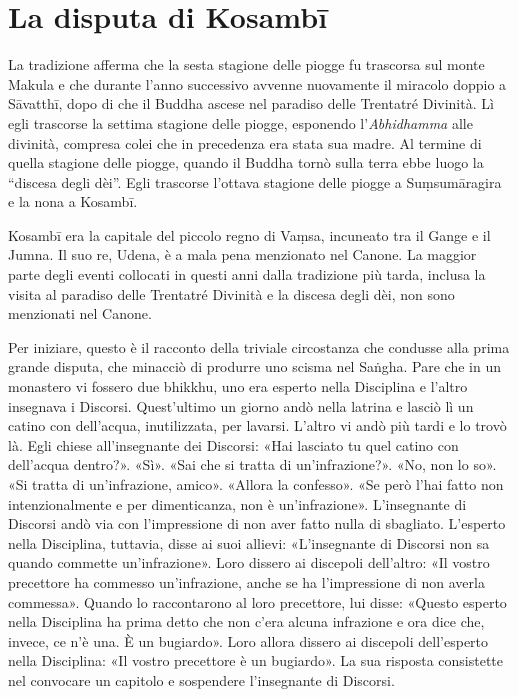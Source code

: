 \chapter{La disputa di Kosambī}

 La tradizione afferma che la sesta stagione delle
piogge fu trascorsa sul monte Makula e che durante l’anno successivo avvenne
nuovamente il miracolo doppio a Sāvatthī, dopo di che il Buddha ascese nel
paradiso delle Trentatré Divinità. Lì egli trascorse la settima stagione delle
piogge, esponendo l’\emph{Abhidhamma} alle divinità, compresa colei che in
precedenza era stata sua madre. Al termine di quella stagione delle piogge,
quando il Buddha tornò sulla terra ebbe luogo la “discesa degli dèi”. Egli
trascorse l’ottava stagione delle piogge a Suṃsumāragira e la nona a Kosambī.

 Kosambī era la capitale del piccolo regno di Vaṃsa,
incuneato tra il Gange e il Jumna. Il suo re, Udena, è a mala pena menzionato
nel Canone. La maggior parte degli eventi collocati in questi anni dalla
tradizione più tarda, inclusa la visita al paradiso delle Trentatré Divinità e
la discesa degli dèi, non sono menzionati nel Canone.

 Per iniziare, questo è il racconto della triviale
circostanza che condusse alla prima grande disputa, che minacciò di produrre uno
scisma nel Saṅgha. Pare che in un monastero vi fossero due bhikkhu, uno era
esperto nella Disciplina e l’altro insegnava i Discorsi. Quest’ultimo un giorno
andò nella latrina e lasciò lì un catino con dell’acqua, inutilizzata, per
lavarsi. L’altro vi andò più tardi e lo trovò là. Egli chiese all’insegnante dei
Discorsi: «Hai lasciato tu quel catino con dell’acqua dentro?». «Sì». «Sai che
si tratta di un’infrazione?». «No, non lo so». «Si tratta di un’infrazione,
amico». «Allora la confesso». «Se però l’hai fatto non intenzionalmente e per
dimenticanza, non è un’infrazione». L’insegnante di Discorsi andò via con
l’impressione di non aver fatto nulla di sbagliato. L’esperto nella Disciplina,
tuttavia, disse ai suoi allievi: «L’insegnante di Discorsi non sa quando
commette un’infrazione». Loro dissero ai discepoli dell’altro: «Il vostro
precettore ha commesso un’infrazione, anche se ha l’impressione di non averla
commessa». Quando lo raccontarono al loro precettore, lui disse: «Questo esperto
nella Disciplina ha prima detto che non c’era alcuna infrazione e ora dice che,
invece, ce n’è una. È un bugiardo». Loro allora dissero ai discepoli
dell’esperto nella Disciplina: «Il vostro precettore è un bugiardo». La sua
risposta consistette nel convocare un capitolo e sospendere l’insegnante di
Discorsi.

